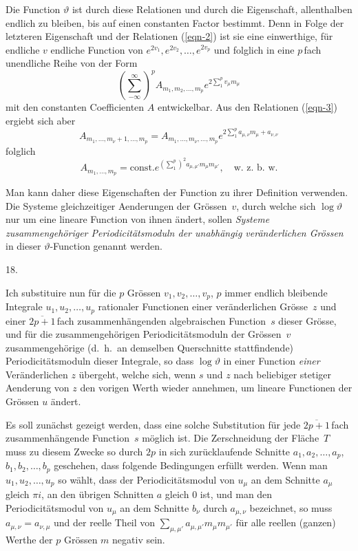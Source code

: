 \documentclass[a4paper,12pt,leqno]{article}
\begin{document}
Die Function $\vartheta$ ist durch diese Relationen und durch die
Eigenschaft, allenthalben endlich zu bleiben, bis auf einen
constanten Factor bestimmt.  Denn in Folge der letzteren
Eigenschaft und der Relationen (\ref{eqn-2}) ist sie eine
einwerthige, f\"{u}r endliche $v$ endliche Function von
$e^{2 v_1}, e^{2 v_2},\ldots, e^{2v_p}$
und folglich in eine $p \,$\-fach unendliche Reihe von der Form
\[ \left( \sum_{-\infty}^\infty \right)^p
      A_{m_1, m_2,\ldots, m_p}
      e^{2 \sum\limits_1^p v_\mu m_\mu} \]
mit den constanten Coefficienten $A$ entwickelbar.  Aus den
Relationen (\ref{eqn-3}) ergiebt sich aber
\[ A_{m_1,\ldots, m_\nu + 1,\ldots, m_p}
   = A_{m_1,\ldots, m_\nu,\ldots, m_p}
      e^{2 \sum\limits_1^p a_{\mu, \nu} m_\mu + a_{\nu, \nu}} \]
folglich
\[ A_{m_1,\ldots, m_p}
   = \mbox{const.} e^{ \left( \sum\limits_1^p \right)^2
      a_{\mu, \mu'} m_\mu m_{\mu'}},
\quad\mbox{w.~z.~b.~w.} \]

Man kann daher diese Eigenschaften der Function zu ihrer
Definition verwenden.  Die Systeme gleichzeitiger Aenderungen der
Gr\"{o}ssen~$v$, durch welche sich $\log \vartheta$ nur um eine
lineare Function von ihnen \"{a}ndert, sollen \emph{Systeme
zusammengeh\"{o}riger Periodicit\"{a}tsmoduln der unabh\"{a}ngig
ver\"{a}nderlichen Gr\"{o}ssen} in dieser $\vartheta$-Function
genannt werden.

\medbreak

\centerline{18.}

\nobreak\medskip

Ich substituire nun f\"{u}r die $p$ Gr\"{o}ssen
$v_1, v_2,\ldots, v_p$, $p$ immer endlich bleib\-ende Integrale
$u_1, u_2,\ldots, u_p$ rationaler Functionen einer
ver\"{a}nderlichen Gr\"{o}sse~$z$ und einer $\overline{2p + 1} \,$\-fach
zusammenh\"{a}ngenden algebraischen Function~$s$ dieser
Gr\"{o}sse, und f\"{u}r die zusammengeh\"{o}rigen
Periodicit\"{a}tsmoduln der Gr\"{o}ssen~$v$ zusammengeh\"{o}rige
(d.~h.\ an demselben Querschnitte stattfindende)
Periodicit\"{a}tsmoduln dieser Integrale, so dass
$\log \vartheta$ in einer Function \emph{einer}
Ver\"{a}nderlichen $z$ \"{u}bergeht, welche sich, wenn $s$ und
$z$ nach beliebiger stetiger Aenderung von $z$ den vorigen Werth
wieder annehmen, um lineare Functionen der Gr\"{o}ssen $u$
\"{a}ndert.

Es soll zun\"{a}chst gezeigt werden, dass eine solche
Substitution f\"{u}r jede $\overline{2p + 1} \,$\-fach zusammenh\"{a}ngende
Function~$s$ m\"{o}glich ist.  Die Zerschneidung der
Fl\"{a}che~$T$ muss zu diesem Zwecke so durch $2p$ in sich
zur\"{u}cklaufende Schnitte
$a_1, a_2,\ldots, a_p$, $b_1, b_2,\ldots, b_p$
geschehen, dass folgende Bedingungen erf\"{u}llt werden.  Wenn
man $u_1, u_2,\ldots, u_p$ so w\"{a}hlt, dass der
Periodicit\"{a}tsmodul von $u_\mu$ an dem Schnitte $a_\mu$ gleich
$\pi i$, an den \"{u}brigen Schnitten $a$ gleich $0$ ist, und man
den Periodicit\"{a}tsmodul von $u_\mu$ an dem Schnitte $b_\nu$
durch $a_{\mu, \nu}$ bezeichnet, so muss
$a_{\mu, \nu} = a_{\nu, \mu}$ und der reelle Theil von
$\sum\limits_{\mu, \mu'} a_{\mu, \mu'} m_\mu m_{\mu'}$
f\"{u}r alle reellen (ganzen) Werthe der $p$ Gr\"{o}ssen $m$
negativ sein.
\end{document}
